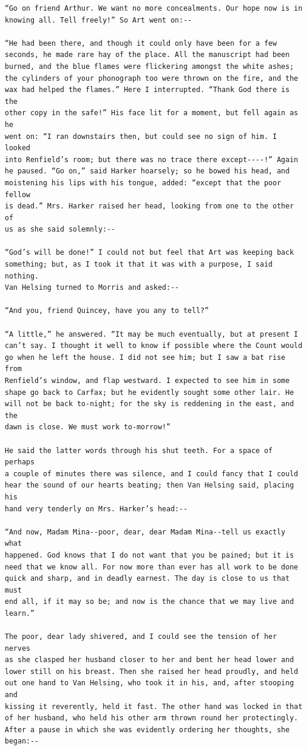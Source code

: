 \documentclass{article}
\begin{document}
\begin{verbatim}
“Go on friend Arthur. We want no more concealments. Our hope now is in
knowing all. Tell freely!” So Art went on:--

“He had been there, and though it could only have been for a few
seconds, he made rare hay of the place. All the manuscript had been
burned, and the blue flames were flickering amongst the white ashes;
the cylinders of your phonograph too were thrown on the fire, and the
wax had helped the flames.” Here I interrupted. “Thank God there is the
other copy in the safe!” His face lit for a moment, but fell again as he
went on: “I ran downstairs then, but could see no sign of him. I looked
into Renfield’s room; but there was no trace there except----!” Again
he paused. “Go on,” said Harker hoarsely; so he bowed his head, and
moistening his lips with his tongue, added: “except that the poor fellow
is dead.” Mrs. Harker raised her head, looking from one to the other of
us as she said solemnly:--

“God’s will be done!” I could not but feel that Art was keeping back
something; but, as I took it that it was with a purpose, I said nothing.
Van Helsing turned to Morris and asked:--

“And you, friend Quincey, have you any to tell?”

“A little,” he answered. “It may be much eventually, but at present I
can’t say. I thought it well to know if possible where the Count would
go when he left the house. I did not see him; but I saw a bat rise from
Renfield’s window, and flap westward. I expected to see him in some
shape go back to Carfax; but he evidently sought some other lair. He
will not be back to-night; for the sky is reddening in the east, and the
dawn is close. We must work to-morrow!”

He said the latter words through his shut teeth. For a space of perhaps
a couple of minutes there was silence, and I could fancy that I could
hear the sound of our hearts beating; then Van Helsing said, placing his
hand very tenderly on Mrs. Harker’s head:--

“And now, Madam Mina--poor, dear, dear Madam Mina--tell us exactly what
happened. God knows that I do not want that you be pained; but it is
need that we know all. For now more than ever has all work to be done
quick and sharp, and in deadly earnest. The day is close to us that must
end all, if it may so be; and now is the chance that we may live and
learn.”

The poor, dear lady shivered, and I could see the tension of her nerves
as she clasped her husband closer to her and bent her head lower and
lower still on his breast. Then she raised her head proudly, and held
out one hand to Van Helsing, who took it in his, and, after stooping and
kissing it reverently, held it fast. The other hand was locked in that
of her husband, who held his other arm thrown round her protectingly.
After a pause in which she was evidently ordering her thoughts, she
began:--


\end{verbatim}
\end{document}
